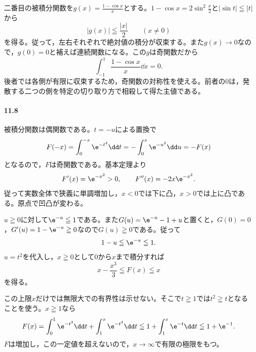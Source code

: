 二番目の被積分関数を$g(x)=\frac{1-\cos x}{x}$とする。$1-\cos x=2\sin^2\frac x2$と$|\sin t|\leqq|t|$から
\[
 |g(x)|\leqq\frac{|x|}{2}\qquad(x\ne0)
\]
を得る。従って，左右それぞれで絶対値の積分が収束する。また$g(x)\to0$なので，$g(0)=0$と補えば連続関数になる。この$g$は奇関数だから
\[
 \int_{-1}^1\frac{1-\cos x}{x}\dd x=0.
\]
後者では各側が有限に収束するため，奇関数の対称性を使える。前者の$0$は，発散する二つの側を特定の切り取り方で相殺して得た主値である。

\paragraph{11.8}
被積分関数は偶関数である。$t=-u$による置換で
\[
 F(-x)=\int_0^{-x}\e^{-t^2}\dd t
 =-\int_0^x\e^{-u^2}\dd u=-F(x)
\]
となるので，$F$は奇関数である。基本定理より
\[
 F'(x)=\e^{-x^2}>0,\qquad F''(x)=-2x\e^{-x^2}.
\]
従って実数全体で狭義に単調増加し，$x<0$では下に凸，$x>0$では上に凸である。原点で凹凸が変わる。

$u\geqq0$に対して$\e^{-u}\leqq1$である。また$G(u)=\e^{-u}-1+u$と置くと，$G(0)=0$，$G'(u)=1-\e^{-u}\geqq0$なので$G(u)\geqq0$である。従って
\[
 1-u\leqq\e^{-u}\leqq1.
\]
$u=t^2$を代入し，$x\geqq0$として$0$から$x$まで積分すれば
\[
 \boxed{x-\frac{x^3}{3}\leqq F(x)\leqq x}
\]
を得る。

この上限$x$だけでは無限大での有界性は示せない。そこで$t\geqq1$では$t^2\geqq t$となることを使う。$x\geqq1$なら
\[
 F(x)=\int_0^1\e^{-t^2}\dd t+\int_1^x\e^{-t^2}\dd t
 \leqq1+\int_1^x\e^{-t}\dd t
 \leqq1+\e^{-1}.
\]
$F$は増加し，この一定値を超えないので，$x\to\infty$で有限の極限をもつ。
